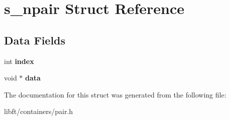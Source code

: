 \hypertarget{structs__npair}{}\section{s\+\_\+npair Struct Reference}
\label{structs__npair}
\subsection*{Data Fields}
\begin{DoxyCompactItemize}
\item 
\hypertarget{structs__npair_a750b5d744c39a06bfb13e6eb010e35d0}{}int {\bfseries index}\label{structs__npair_a750b5d744c39a06bfb13e6eb010e35d0}

\item 
\hypertarget{structs__npair_a735984d41155bc1032e09bece8f8d66d}{}void $\ast$ {\bfseries data}\label{structs__npair_a735984d41155bc1032e09bece8f8d66d}

\end{DoxyCompactItemize}


The documentation for this struct was generated from the following file\+:\begin{DoxyCompactItemize}
\item 
libft/containers/pair.\+h\end{DoxyCompactItemize}
